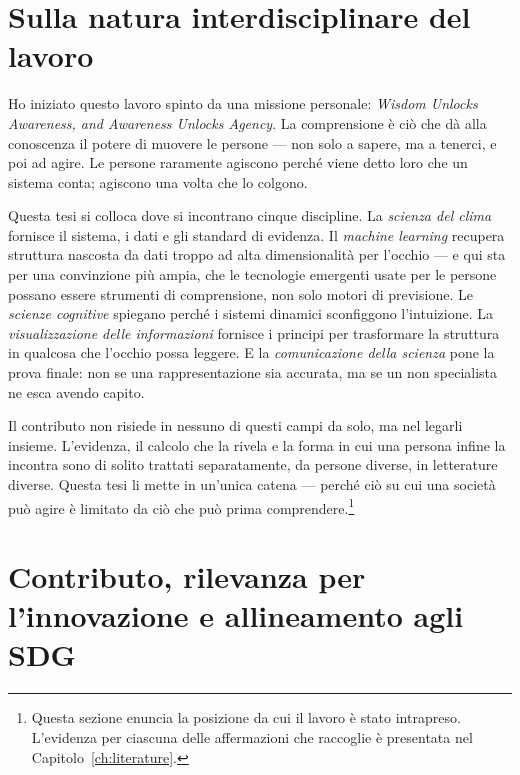 \section{Sulla natura interdisciplinare del lavoro}
\label{sec:positioning}

Ho iniziato questo lavoro spinto da una missione personale: \emph{Wisdom Unlocks Awareness, and Awareness Unlocks Agency}. La comprensione è ciò che dà alla conoscenza il potere di muovere le persone --- non solo a sapere, ma a tenerci, e poi ad agire. Le persone raramente agiscono perché viene detto loro che un sistema conta; agiscono una volta che lo colgono.

Questa tesi si colloca dove si incontrano cinque discipline. La \emph{scienza del clima} fornisce il sistema, i dati e gli standard di evidenza. Il \emph{machine learning} recupera struttura nascosta da dati troppo ad alta dimensionalità per l'occhio --- e qui sta per una convinzione più ampia, che le tecnologie emergenti usate per le persone possano essere strumenti di comprensione, non solo motori di previsione. Le \emph{scienze cognitive} spiegano perché i sistemi dinamici sconfiggono l'intuizione. La \emph{visualizzazione delle informazioni} fornisce i principi per trasformare la struttura in qualcosa che l'occhio possa leggere. E la \emph{comunicazione della scienza} pone la prova finale: non se una rappresentazione sia accurata, ma se un non specialista ne esca avendo capito.

Il contributo non risiede in nessuno di questi campi da solo, ma nel legarli insieme. L'evidenza, il calcolo che la rivela e la forma in cui una persona infine la incontra sono di solito trattati separatamente, da persone diverse, in letterature diverse. Questa tesi li mette in un'unica catena --- perché ciò su cui una società può agire è limitato da ciò che può prima comprendere.\footnote{Questa sezione enuncia la posizione da cui il lavoro è stato intrapreso. L'evidenza per ciascuna delle affermazioni che raccoglie è presentata nel Capitolo~\ref{ch:literature}.}

\section{Contributo, rilevanza per l'innovazione e allineamento agli SDG}
\label{sec:contribution}

